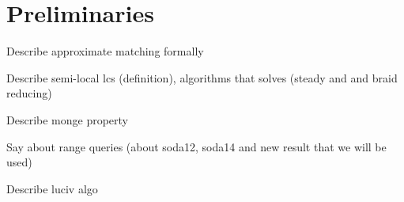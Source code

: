 \section*{Preliminaries}
\label{section:preliminaries}
Describe approximate matching formally

Describe semi-local lcs (definition), algorithms that solves (steady and and braid reducing)

Describe monge property  


Say about range queries (about soda12, soda14 and new result that we will be used)

Describe luciv algo

